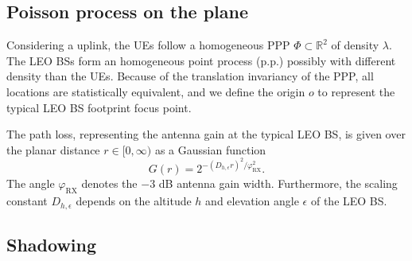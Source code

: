 \documentclass[lettersize,journal]{IEEEtran}
\newcommand{\R}{\mathbb{R}}
\newtheorem*{remark}{Remark}
\begin{document}
\label{sec:analysissec}




\subsection{Poisson process on the plane}
\label{sec:gainprocess}


Considering a uplink, the UEs follow a homogeneous PPP $\Phi \subset \R^2$ of density $\lambda$. The LEO BSs form an homogeneous point process (p.p.) possibly with different density than the UEs. Because of the translation invariancy of the PPP, all locations are statistically equivalent, and we define the origin $\textit{o}$ to represent the typical LEO BS footprint focus point.

The path loss, representing the antenna gain at the typical LEO BS, is given over the planar distance $r \in [0, \infty)$ as a Gaussian function
  \begin{equation}
    \label{eq:Gaussianantpat}
    G(r) = 2^{-(D_{h,\epsilon}r)^2 / \varphi_{\text{RX}}^2}.
  \end{equation}
  The angle $\varphi_{\text{RX}}$ denotes the $-3$ dB antenna gain width. Furthermore, the scaling constant $D_{h,\epsilon}$ depends on the altitude $h$ and elevation angle $\epsilon$ of the LEO BS. %



  
  \subsection{Shadowing}
\end{document}

